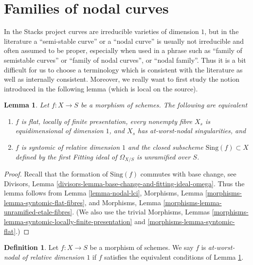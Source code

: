 \documentclass{stacks-project}
\theoremstyle{plain}
\newtheorem{lemma}[subsection]{Lemma}
\theoremstyle{definition}
\newtheorem{definition}[subsection]{Definition}
\theoremstyle{remark}
\numberwithin{equation}{subsection}
\begin{document}
\section{Families of nodal curves}
\label{section-families-nodal}

\noindent
In the Stacks project curves are irreducible varieties of dimension $1$,
but in the literature a ``semi-stable curve'' or a ``nodal curve'' is
usually not irreducible and often assumed to be proper, especially
when used in a phrase such as ``family of semistable curves'' or
``family of nodal curves'', or ``nodal family''. Thus it is a bit
difficult for us to choose a terminology which is consistent with the
literature as well as internally consistent. Moreover, we really want
to first study the notion introduced in the following lemma (which is
local on the source).

\begin{lemma}
\label{lemma-nodal-family}
Let $f : X \to S$ be a morphism of schemes. The following are equivalent
\begin{enumerate}
\item $f$ is flat, locally of finite presentation, every nonempty fibre
$X_s$ is equidimensional of dimension $1$, and $X_s$ has
at-worst-nodal singularities, and
\item $f$ is syntomic of relative dimension $1$ and the closed subscheme
$\text{Sing}(f) \subset X$ defined by the first Fitting ideal of
$\Omega_{X/S}$ is unramified over $S$.
\end{enumerate}
\end{lemma}

\begin{proof}
Recall that the formation of $\text{Sing}(f)$ commutes with base
change, see Divisors, Lemma
\ref{divisors-lemma-base-change-and-fitting-ideal-omega}.
Thus the lemma follows from Lemma \ref{lemma-nodal-lci},
Morphisms, Lemma \ref{morphisms-lemma-syntomic-flat-fibres}, and
Morphisms, Lemma \ref{morphisms-lemma-unramified-etale-fibres}.
(We also use the trivial
Morphisms, Lemmas \ref{morphisms-lemma-syntomic-locally-finite-presentation}
and \ref{morphisms-lemma-syntomic-flat}.)
\end{proof}

\begin{definition}
\label{definition-nodal-family}
Let $f : X \to S$ be a morphism of schemes. We say $f$ is
{\it at-worst-nodal of relative dimension $1$} if $f$ satisfies
the equivalent conditions of Lemma \ref{lemma-nodal-family}.
\end{definition}
\end{document}
